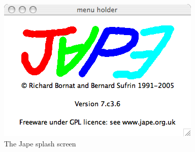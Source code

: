 \documentclass[11pt]{book}
\begin{document}
\begin{figure}
\centering
\includegraphics[scale=0.5]{pics/splashscreen.png}
\caption{The Jape splash screen}
\label{fig:splashscreen}
\end{figure}
\end{document}
